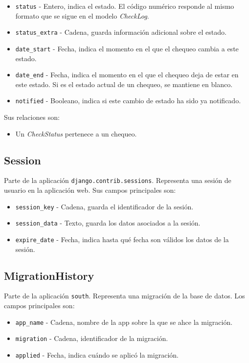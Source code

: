 \begin{itemize}
\item \texttt{status} - Entero, indica el estado. El código numérico responde al
  mismo formato que se sigue en el modelo \textit{CheckLog}.
\item \texttt{status\_extra} - Cadena, guarda información adicional sobre el estado.
\item \texttt{date\_start} - Fecha, indica el momento en el que el chequeo
  cambia a este estado.
\item \texttt{date\_end} - Fecha, indica el momento en el que el chequeo deja de
  estar en este estado. Si es el estado actual de un chequeo, se mantiene en blanco.
\item \texttt{notified} - Booleano, indica si este cambio de estado ha sido ya notificado.

\end{itemize}

Sus relaciones son:

\begin{itemize}
\item Un \textit{CheckStatus} pertenece a un chequeo.
\end{itemize}

\subsection{Session}

Parte de la aplicación \texttt{django.contrib.sessions}. Representa una sesión
de usuario en la aplicación web. Sus campos principales son:

\begin{itemize}
\item \texttt{session\_key} - Cadena, guarda el identificador de la sesión.
\item \texttt{session\_data} - Texto, guarda los datos asociados a la sesión.
\item \texttt{expire\_date} - Fecha, indica hasta qué fecha son válidos los
  datos de la sesión.
\end{itemize}

\subsection{MigrationHistory}

Parte de la aplicación \texttt{south}. Representa una migración de la base de
datos. Los campos principales son:

\begin{itemize}
\item \texttt{app\_name} - Cadena, nombre de la app sobre la que se ahce la migración.
\item \texttt{migration} - Cadena, identificador de la migración.
\item \texttt{applied} - Fecha, indica cuándo se aplicó la migración.
\end{itemize}

